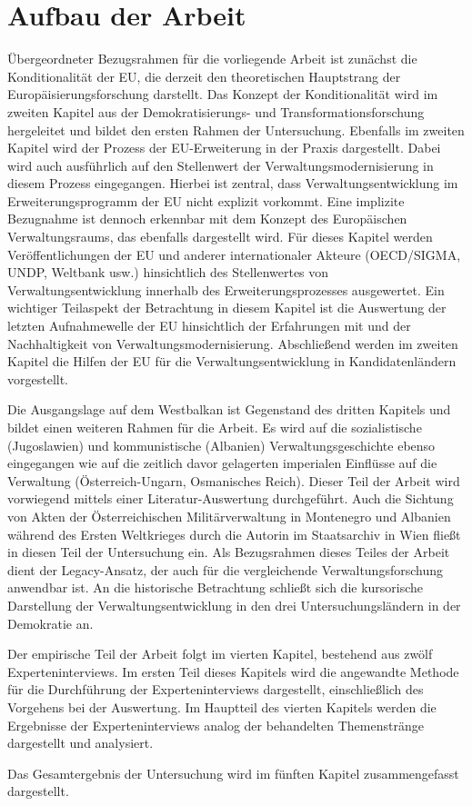 \section{Aufbau der Arbeit }
Übergeordneter Bezugsrahmen für die vorliegende Arbeit ist zunächst die Konditionalität der EU, die derzeit den theoretischen Hauptstrang der Europäisierungsforschung darstellt. Das Konzept der Konditionalität wird im zweiten Kapitel aus der Demokratisierungs- und Transformationsforschung hergeleitet und bildet den ersten Rahmen der Untersuchung.
Ebenfalls im zweiten Kapitel wird der Prozess der EU-Erweiterung in der Praxis dargestellt. Dabei wird auch ausführlich auf den Stellenwert der Verwaltungsmodernisierung in diesem Prozess eingegangen. Hierbei ist zentral, dass Verwaltungsentwicklung im Erweiterungsprogramm der EU nicht explizit vorkommt. Eine implizite Bezugnahme ist dennoch erkennbar mit dem Konzept des Europäischen Verwaltungsraums, das ebenfalls dargestellt wird. Für dieses Kapitel werden Veröffentlichungen der EU und anderer internationaler Akteure (OECD/SIGMA, UNDP, Weltbank usw.) hinsichtlich des Stellenwertes von Verwaltungsentwicklung innerhalb des Erweiterungsprozesses ausgewertet. Ein wichtiger Teilaspekt der Betrachtung in diesem Kapitel ist die Auswertung der letzten Aufnahmewelle der EU hinsichtlich der Erfahrungen mit und der Nachhaltigkeit von Verwaltungsmodernisierung. Abschließend werden im zweiten Kapitel die Hilfen der EU für die Verwaltungsentwicklung in Kandidatenländern vorgestellt. \par
Die Ausgangslage auf dem Westbalkan ist Gegenstand des dritten Kapitels und bildet einen weiteren Rahmen für die Arbeit. Es wird auf die sozialistische (Jugoslawien) und kommunistische (Albanien) Verwaltungsgeschichte ebenso eingegangen wie auf die zeitlich davor gelagerten imperialen Einflüsse auf die Verwaltung (Österreich-Ungarn, Osmanisches Reich). Dieser Teil der Arbeit wird vorwiegend mittels einer Literatur-Auswertung durchgeführt. Auch die Sichtung von Akten der Österreichischen Militärverwaltung in Montenegro und Albanien während des Ersten Weltkrieges durch die Autorin im Staatsarchiv in Wien fließt in diesen Teil der Untersuchung ein. Als Bezugsrahmen dieses Teiles der Arbeit dient der Legacy-Ansatz, der auch für die vergleichende Verwaltungsforschung anwendbar ist. An die historische Betrachtung schließt sich die kursorische Darstellung der Verwaltungsentwicklung in den drei Untersuchungsländern in der Demokratie an.
\par
Der empirische Teil der Arbeit folgt im vierten Kapitel, bestehend aus zwölf Experteninterviews. Im ersten Teil dieses Kapitels wird die angewandte Methode für die Durchführung der Experteninterviews dargestellt, einschließlich des Vorgehens bei der Auswertung. Im Hauptteil des vierten Kapitels werden die Ergebnisse der Experteninterviews analog der behandelten Themenstränge dargestellt und analysiert.\par
Das Gesamtergebnis der Untersuchung wird im fünften Kapitel zusammengefasst dargestellt.